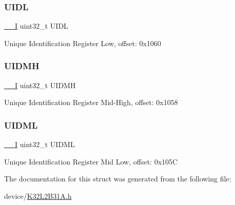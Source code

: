 \subsubsection{\texorpdfstring{UIDL}{UIDL}}
{\footnotesize\ttfamily \mbox{\hyperlink{core__cm0plus_8h_af63697ed9952cc71e1225efe205f6cd3}{\+\_\+\+\_\+I}} uint32\+\_\+t U\+I\+DL}

Unique Identification Register Low, offset\+: 0x1060 \mbox{\label{struct_s_i_m___type_a6526be9b8cd1160be6ff367641220e96}} 
\subsubsection{\texorpdfstring{UIDMH}{UIDMH}}
{\footnotesize\ttfamily \mbox{\hyperlink{core__cm0plus_8h_af63697ed9952cc71e1225efe205f6cd3}{\+\_\+\+\_\+I}} uint32\+\_\+t U\+I\+D\+MH}

Unique Identification Register Mid-\/\+High, offset\+: 0x1058 \mbox{\label{struct_s_i_m___type_a9d04f09d406768348505eb747ade1e23}} 
\subsubsection{\texorpdfstring{UIDML}{UIDML}}
{\footnotesize\ttfamily \mbox{\hyperlink{core__cm0plus_8h_af63697ed9952cc71e1225efe205f6cd3}{\+\_\+\+\_\+I}} uint32\+\_\+t U\+I\+D\+ML}

Unique Identification Register Mid Low, offset\+: 0x105C 

The documentation for this struct was generated from the following file\+:\begin{DoxyCompactItemize}
\item 
device/\mbox{\hyperlink{_k32_l2_b31_a_8h}{K32\+L2\+B31\+A.\+h}}\end{DoxyCompactItemize}
